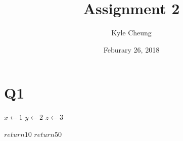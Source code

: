 \documentclass{article}
\title{Assignment 2}
\date{Feburary 26, 2018}
\author{Kyle Cheung}
\begin{document}
\maketitle
{}
\newpage
{}

\section{Q1}

\begin{algorithmic}
\State $x\gets 1$
\State $y\gets 2$
\state $z\gets 3$

  \State $return 10$
  \State $return 50$
  
\end{algorithmic}
\end{document}
